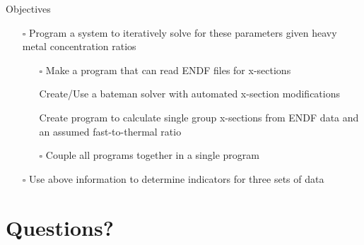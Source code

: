\documentclass{beamer}
\newcommand{\cmark}{\ding{51}}%
\newcommand{\done}{\rlap{$\square$}{\raisebox{2pt}{\large\hspace{1pt}\cmark}}%
  \hspace{-2.5pt}}
\newcommand{\notdone}{$\square$}
\begin{document}
\begin{frame}[allowframebreaks]{Objectives}
\begin{itemize}
{  respect to one of the isotopes determined above}
  \begin{itemize}
  \item[\tiny\done]{\tiny Burnup}
  \item[\tiny\done]{\tiny Fluence Rate}
  \item[\tiny\done]{\tiny Initial Enrichment}
  \item[\tiny\done]{\tiny Fuel Age}
  \item[\tiny\notdone]{\tiny Fast-to-thermal ratios (requires iteration)}
  \end{itemize}
\item[\notdone]{\small Program a system to iteratively solve for these parameters
  given heavy metal concentration
  ratios}
  \begin{itemize}
  \item[\tiny\notdone]{\tiny Make a program that can read ENDF files for x-sections}
  \item[\tiny\done]{\tiny Create/Use a bateman solver with automated x-section modifications}
  \item[\tiny\done]{\tiny Create program to calculate single group x-sections from
    ENDF data and an assumed
    fast-to-thermal ratio}
  \item[\tiny\notdone]{\tiny Couple all programs together in a single program} 
  \end{itemize}
\item[\notdone]{\small Use above information to determine indicators for three sets of data}
\end{itemize}
\end{frame}




\appendix
\section{Questions?}
\begin{frame}
\sectionpage
\end{frame}
\end{document}
